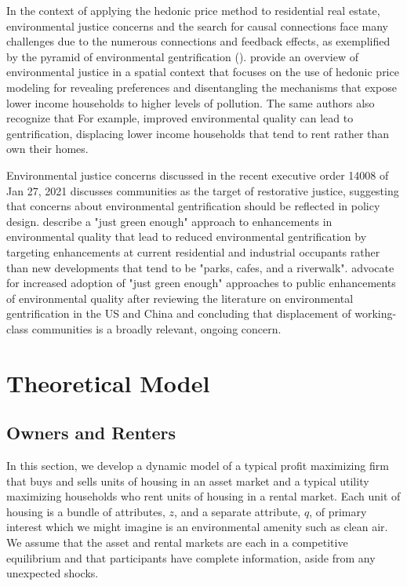 \documentclass[ecta,nameyear,draft]{econsocart}
\theoremstyle{plain}
\theoremstyle{remark}
\begin{document}
In the context of applying the hedonic price method to residential real estate, environmental justice concerns and the search for causal connections face many challenges due to the numerous connections and feedback effects, as exemplified by the pyramid of environmental gentrification (\cite{banzhafJustice19}). \cite{banzhafJustice19} provide an overview of environmental justice in a spatial context that focuses on the use of hedonic price modeling for revealing preferences and disentangling the mechanisms that expose lower income households to higher levels of pollution. The same authors also recognize that For example, improved environmental quality can lead to gentrification, displacing lower income households that tend to rent rather than own their homes. 

Environmental justice concerns discussed in the recent executive order 14008 of Jan 27, 2021 discusses communities as the target of restorative justice, suggesting that concerns about environmental gentrification should be reflected in policy design. \cite{curran12} describe a "just green enough" approach to enhancements in environmental quality that lead to reduced environmental gentrification by targeting enhancements at current residential and industrial occupants rather than new developments that tend to be "parks, cafes, and a riverwalk". \cite{wolch14} advocate for increased adoption of "just green enough" approaches to public enhancements of environmental quality after reviewing the literature on environmental gentrification in the US and China and concluding that displacement of working-class communities is a broadly relevant, ongoing concern. 







\section{Theoretical Model}
\subsection{Owners and Renters}
In this section, we develop a dynamic model of a typical profit maximizing firm that buys and sells units of housing in an asset market and a typical utility maximizing households who rent units of housing in a rental market. Each unit of housing is a bundle of attributes, $z$, and a separate attribute, $q$, of primary interest which we might imagine is an environmental amenity such as clean air. We assume that the asset and rental markets are each in a competitive equilibrium and that participants have complete information, aside from any unexpected shocks.
\end{document}
